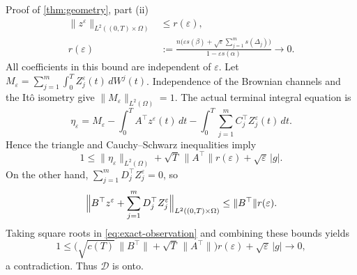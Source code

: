 \documentclass[twocolumn]{autart}
\newcounter{part}
\begin{document}
\begin{pf*}{Proof of \cref{thm:geometry}, part \textup{(ii)}}
\begin{align*}
\|z^\varepsilon\|_{L^2((0,T)\times\Omega)}&\leq r(\varepsilon),\\
r(\varepsilon)&:=\frac{n\bigl(\varepsilon s(\beta)+\sqrt{\varepsilon}
\sum_{j=1}^m s(\Delta_j)\bigr)}{1-\varepsilon s(\alpha)}
\longrightarrow0.
\end{align*}
All coefficients in this bound are independent of $\varepsilon$.
Let $M_\varepsilon=\sum_{j=1}^m\int_0^T
Z_j^\varepsilon(t)\,dW^j(t)$. Independence of the Brownian channels and
the It\^o isometry give $\|M_\varepsilon\|_{L^2(\Omega)}=1$.
The actual terminal integral equation is
\begin{equation*}
\eta_\varepsilon=M_\varepsilon-
\int_0^T A^\top z^\varepsilon(t)\,dt-
\int_0^T\sum_{j=1}^m C_j^\top Z_j^\varepsilon(t)\,dt.
\end{equation*}
Hence the triangle and Cauchy--Schwarz inequalities imply
\begin{equation*}
1\leq\|\eta_\varepsilon\|_{L^2(\Omega)}+
\sqrt T\,\|A^\top\|r(\varepsilon)+\sqrt\varepsilon\,|g|.
\end{equation*}
On the other hand, $\sum_{j=1}^mD_j^\top Z_j^\varepsilon=0$, so
\begin{equation*}
\Bigl\|B^\top z^\varepsilon+
\sum_{j=1}^mD_j^\top Z_j^\varepsilon\Bigr\|_{L^2((0,T)\times\Omega)}
\leq\|B^\top\|r(\varepsilon).
\end{equation*}
Taking square roots in \cref{eq:exact-observation} and combining these
bounds yields
\begin{equation*}
1\leq\bigl(\sqrt{c(T)}\,\|B^\top\|+
\sqrt T\,\|A^\top\|\bigr)r(\varepsilon)
+\sqrt\varepsilon\,|g|\longrightarrow0,
\end{equation*}
a contradiction. Thus $\mathcal D$ is onto.


\end{pf*}
\end{document}
